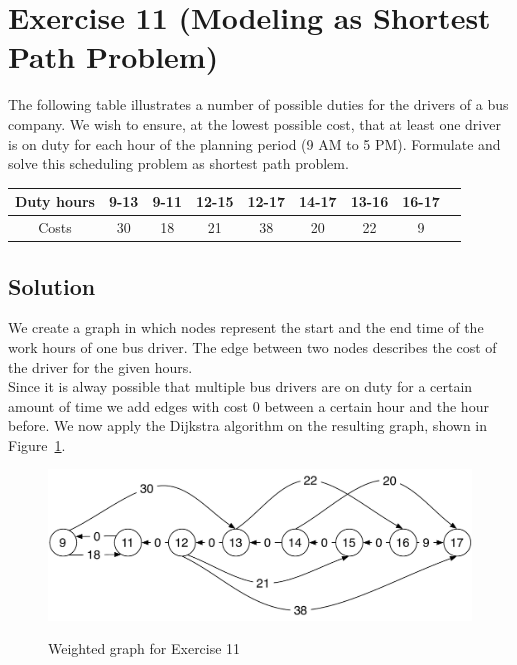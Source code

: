 \documentclass[a4paper, 12pt]{article}
\begin{document}
\section{Exercise 11 (Modeling as Shortest Path Problem)}

The following table illustrates a number of possible duties for the drivers of
a bus company. We wish to ensure, at the lowest possible cost, that at least
one driver is on duty for each hour of the planning period (9 AM to 5 PM).
Formulate and solve this scheduling problem as shortest path problem.

\begin{center}
    \begin{tabular}{|c|c|c|c|c|c|c|c|c|}
        \hline
        Duty hours  & 9-13  & 9-11  & 12-15 & 12-17 & 14-17 & 13-16 & 16-17\\
        \hline
        Costs       & 30    & 18    & 21    & 38    & 20    & 22    & 9\\
        \hline
    \end{tabular}
\end{center}

\subsection{Solution}

We create a graph in which nodes represent the start and the end time of the
work hours of one bus driver. The edge between two nodes describes the cost of
the driver for the given hours.\\

Since it is alway possible that multiple bus drivers are on duty for a certain
amount of time we add edges with cost 0 between a certain hour and the hour
before. We now apply the Dijkstra algorithm on the resulting graph, shown in
Figure~\ref{figure:Bus_Driver_Schedule}.

\begin{figure}[htbp]
    \caption{Weighted graph for Exercise 11}
    \vskip 0.2cm
    \centering
    \includegraphics[width=\textwidth]{Figures/Bus_Driver_Schedule}
    \label{figure:Bus_Driver_Schedule}
\end{figure}
\end{document}
